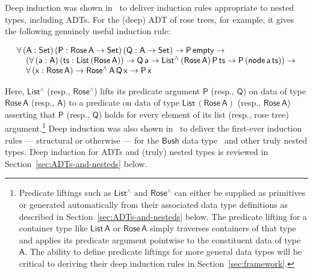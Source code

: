 \documentclass[9pt]{entcs}
\begin{document}
Deep induction was shown in~\cite{jp20} to deliver induction rules
appropriate to nested types, including ADTs.  For the (deep) ADT of
rose trees, for example, it gives the following genuinely useful
induction rule:

\vspace*{-0.075in}

\begin{equation}\label{eq:rose}
\begin{array}{l}
\mathsf{\forall \,(A : Set)\,(P : Rose\,A \to Set)\,(Q : A \to Set)
  \to P\,empty \to}\\ 
\mathsf{\hspace*{0.15in}(\forall \,(a : A)\, (ts :
  List\,(Rose\,A))\to Q\,a \to List^\land\,(Rose\,A)\, P\,ts \to P\,(node\,a\,ts)) \to}\\
\mathsf{\hspace*{0.15in}\forall \,(x :
  Rose\,A) \to Rose^\land\,A\,Q\, x \to P\,x} 
\end{array}
\end{equation}

\noindent
Here, $\mathsf{List^\land}$ (resp., $\mathsf{Rose^\land}$) lifts its
predicate argument $\mathsf{P}$ (resp., $\mathsf{Q}$) on data of type
$\mathsf{Rose\,A}$ (resp., $\mathsf{A}$) to a predicate on data of
type $\mathsf{List\,(Rose\,A)}$ (resp., $\mathsf{Rose\,A}$) asserting
that $\mathsf{P}$ (resp., $\mathsf{Q}$) holds for every element of its
list (resp., rose tree) argument.\footnote{Predicate liftings such as
  $\mathsf{List^\land}$ and $\mathsf{Rose^\land}$ can either be
  supplied as primitives or generated automatically from their
  associated data type definitions as described in
  Section~\ref{sec:ADTs-and-nesteds} below. The predicate lifting for
  a container type like $\mathsf{List\,A}$ or $\mathsf{Rose\,A}$
  simply traverses containers of that type and applies its predicate
  argument pointwise to the constituent data of type $\mathsf{A}$.
  The ability to define predicate liftings for more general data types
  will be critical to deriving their deep induction rules in
  Section~\ref{sec:framework}.} Deep induction was also shown
in~\cite{jp20} to
deliver the first-ever induction rules --- structural or otherwise ---
for the $\mathsf{Bush}$ data type~\cite{bm98} and other truly nested
types. Deep induction for ADTs and (truly) nested types is reviewed in
Section~\ref{sec:ADTs-and-nesteds} below.
\end{document}
